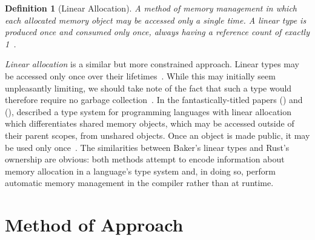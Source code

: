 \documentclass[11pt,a4paper]{article}
\theoremstyle{break}
\newtheorem{defn}{Definition}
\begin{document}
\begin{defn}[Linear Allocation]
A method of memory management in which each allocated memory object may be accessed only a single time. A linear type is produced once and consumed only once, always having a reference count of exactly 1~\cite{Baker:1992:LLL:142137.142162,hawblitzel2004low,Baker:1995:UVL:199818.199860}.
\end{defn}

\textit{Linear allocation} is a similar but more constrained approach. Linear types may be accessed only once over their lifetimes~\cite{Baker:1992:LLL:142137.142162,hawblitzel2004low,Baker:1995:UVL:199818.199860}. While this may initially seem unpleasantly limiting, we should take note of the fact that such a type would therefore require no garbage collection~\cite{Baker:1992:LLL:142137.142162,Baker:1995:UVL:199818.199860}. In the fantastically-titled papers  (\citeyear{Baker:1992:LLL:142137.142162}) and  (\citeyear{Baker:1995:UVL:199818.199860}), \citeauthor{Baker:1992:LLL:142137.142162} described a type system for programming languages with linear allocation which differentiates shared memory objects, which may be accessed outside of their parent scopes, from unshared objects. Once an object is made public, it may be used only once~\cite{Baker:1995:UVL:199818.199860,Baker:1992:LLL:142137.142162}. The similarities between Baker's linear types and Rust's ownership are obvious: both methods attempt to encode information about memory allocation in a language's type system and, in doing so, perform automatic memory management in the compiler rather than at runtime.



\vspace*{-.1in}
\section{Method of Approach}
\label{sec:method}
\end{document}
